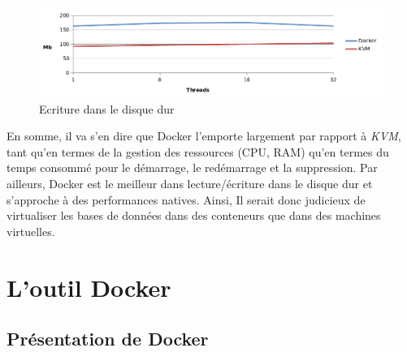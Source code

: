 \begin{onehalfspace}
\begin{figure}[H]
\centering
\includegraphics [width=160mm]{chapitre2/assets/file-io-write.png}
\caption{Ecriture dans le disque dur}
\label{fig:}
\end{figure}


En somme, il va s'en dire que Docker l'emporte largement par rapport à \emph{KVM}, tant qu'en termes de la gestion des ressources (CPU, RAM) qu'en termes du temps consommé pour le démarrage, le redémarrage et la suppression. Par ailleurs, Docker est le meilleur dans lecture/écriture dans le disque dur et s'approche à des performances natives. Ainsi, Il serait donc judicieux de virtualiser les bases de données dans des conteneurs que dans des machines virtuelles. 







\section{L'outil Docker}

\subsection{Présentation de Docker}


\end{onehalfspace}
